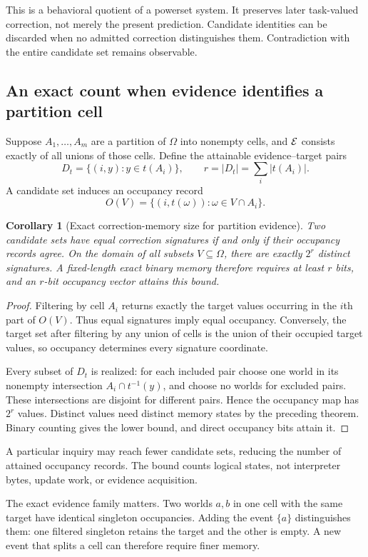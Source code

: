 \documentclass[11pt,letterpaper]{article}
\theoremstyle{plain}
\newtheorem{corollary}[theorem]{Corollary}
\theoremstyle{definition}
\begin{document}
This is a behavioral quotient of a powerset system. It preserves later task-valued correction, not merely the present prediction. Candidate identities can be discarded when no admitted correction distinguishes them. Contradiction with the entire candidate set remains observable.

\subsection{An exact count when evidence identifies a partition cell}
Suppose $A_1,\ldots,A_m$ are a partition of $\Omega$ into nonempty cells, and $\mathcal E$ consists exactly of all unions of those cells. Define the attainable evidence--target pairs
\[
D_t=\{(i,y): y\in t(A_i)\},\qquad r=|D_t|=\sum_i|t(A_i)|.
\]
A candidate set induces an occupancy record
\[
O(V)=\{(i,t(\omega)):\omega\in V\cap A_i\}.
\]

\begin{corollary}[Exact correction-memory size for partition evidence]\label{cor:occupancy}
Two candidate sets have equal correction signatures if and only if their occupancy records agree. On the domain of all subsets $V\subseteq\Omega$, there are exactly $2^r$ distinct signatures. A fixed-length exact binary memory therefore requires at least $r$ bits, and an $r$-bit occupancy vector attains this bound.
\end{corollary}
\begin{proof}
Filtering by cell $A_i$ returns exactly the target values occurring in the $i$th part of $O(V)$. Thus equal signatures imply equal occupancy. Conversely, the target set after filtering by any union of cells is the union of their occupied target values, so occupancy determines every signature coordinate.

Every subset of $D_t$ is realized: for each included pair choose one world in its nonempty intersection $A_i\cap t^{-1}(y)$, and choose no worlds for excluded pairs. These intersections are disjoint for different pairs. Hence the occupancy map has $2^r$ values. Distinct values need distinct memory states by the preceding theorem. Binary counting gives the lower bound, and direct occupancy bits attain it.
\end{proof}

A particular inquiry may reach fewer candidate sets, reducing the number of attained occupancy records. The bound counts logical states, not interpreter bytes, update work, or evidence acquisition.

The exact evidence family matters. Two worlds $a,b$ in one cell with the same target have identical singleton occupancies. Adding the event $\{a\}$ distinguishes them: one filtered singleton retains the target and the other is empty. A new event that splits a cell can therefore require finer memory.
\end{document}
